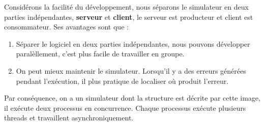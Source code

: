 \documentclass[14px]{article}
\begin{document}
	Considérons la facilité du développement, nous séparons le simulateur en deux parties indépendantes, \textbf{serveur} et \textbf{client}, le serveur est producteur et client est consommateur. Ses avantages sont que :
	\begin{enumerate}
		\item Séparer le logiciel en deux parties indépendantes, nous pouvons développer paralèllement, c'est plus facile de travailler en groupe.
		\item On peut mieux maintenir le simulateur. Lorsqu'il y a des erreurs générées pendant l'exécution, il plus pratique de localiser où produit l'erreur.
	\end{enumerate}
	
	Par conséquence, on a un simulateur dont la structure est décrite par cette image, il exécute deux processus en concurrence. Chaque processus exécute plusieurs threads et travaillent asynchroniquement.
	
	\begin{figure}[htbp]
	\end{figure}
\end{document}
